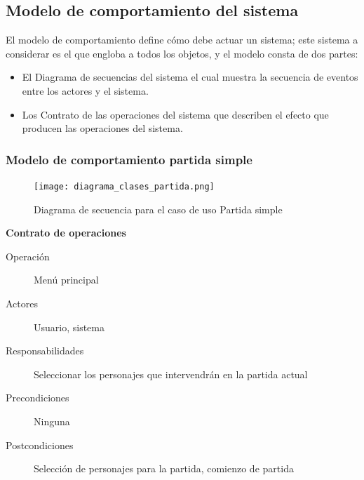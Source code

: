 \subsection{Modelo de comportamiento del sistema}

El modelo de comportamiento define cómo debe actuar un sistema; este sistema a considerar es el que
engloba a todos los objetos, y el modelo consta de dos partes:
\begin{itemize}
    \item El Diagrama de secuencias del sistema el cual muestra la secuencia de eventos entre los actores
        y el sistema.
    \item Los Contrato de las operaciones del sistema que describen el efecto que producen las operaciones
        del sistema.
\end{itemize}

\subsubsection{Modelo de comportamiento partida simple}

\begin{figure}[h]
  \label{diagrama_clases}
  \begin{center}
    \texttt{[image: diagrama\_clases\_partida.png]}
  \end{center}
  \caption{Diagrama de secuencia para el caso de uso Partida simple}
\end{figure}

\textbf{Contrato de operaciones}
\begin{description}
    \item[Operación] Menú principal
    \item[Actores] Usuario, sistema 
    \item[Responsabilidades] Seleccionar los personajes que intervendrán en la partida actual
    \item[Precondiciones] Ninguna
    \item[Postcondiciones] Selección de personajes para la partida, comienzo de partida
\end{description}
